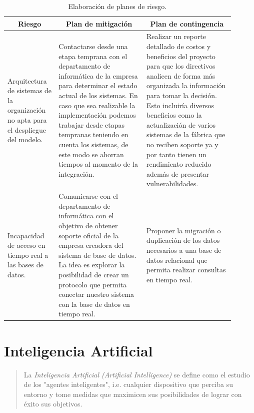 \documentclass[a4paper,12pt]{article}
\begin{document}
\begin{table}[H]
\centering
\begin{tabular}{p{0.2\linewidth} p{0.35\linewidth} p{0.35\linewidth}}
\hline
\multicolumn{1}{c}{\textbf{Riesgo}} &
  \multicolumn{1}{c}{\textbf{Plan de mitigación}} &
  \multicolumn{1}{c}{\textbf{Plan de contingencia}} \\ \hline
Arquitectura de sistemas de la organización no apta para el despliegue del modelo. &
  Contactarse desde una etapa temprana con el departamento de informática de la empresa para determinar el estado actual de los sistemas. En caso que sea realizable la implementación podemos trabajar desde etapas tempranas teniendo en cuenta los sistemas, de este modo se ahorran tiempos al momento de la integración. &
  Realizar un reporte detallado de costos y beneficios del proyecto para que los directivos analicen de forma más organizada la información para tomar la decisión. Esto incluiría diversos beneficios como la actualización de varios sistemas de la fábrica que no reciben soporte ya y por tanto tienen un rendimiento reducido además de presentar vulnerabilidades. \\
Incapacidad de acceso en tiempo real a las bases de datos. &
  Comunicarse con el departamento de informática con el objetivo de obtener soporte oficial de la empresa creadora del sistema de base de datos. La idea es explorar la posibilidad de crear un protocolo que permita conectar nuestro sistema con la base de datos en tiempo real. &
  Proponer la migración o duplicación de los datos necesarios a una base de datos relacional que permita realizar consultas en tiempo real. \\ \hline
\end{tabular}
\caption{Elaboración de planes de riesgo.}
\label{tab:risks-plans}
\end{table}

\clearpage

\section{Inteligencia Artificial}

\begin{quote}
	La \textit{Inteligencia Artificial (Artificial Intelligence)} se define como el estudio de los "agentes inteligentes", i.e. cualquier dispositivo que perciba su entorno y tome medidas que maximicen sus posibilidades de lograr con éxito sus objetivos.
	  
	\hfill \citet{poole1998}
\end{quote}
\end{document}

